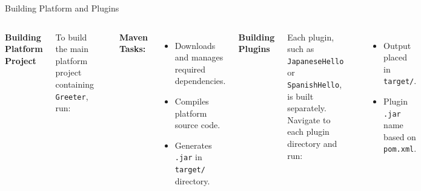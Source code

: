 \documentclass[aspectratio=169, table]{beamer}
\begin{document}
\begin{frame}[fragile]{Building Platform and Plugins}
	\vspace{20pt}
	\begin{columns}[t]
		\textbf{Building Platform Project}
		
		To build the main platform project containing \texttt{Greeter}, run:
		
		\begin{lstlisting}[language=bash, basicstyle=\footnotesize\ttfamily]
			mvn clean package install
		\end{lstlisting}
		
		\textbf{Maven Tasks:}
		\begin{itemize}
			\item Downloads and manages required dependencies.
			\item Compiles platform source code.
			\item Generates \texttt{.jar} in \texttt{target/} directory.
		\end{itemize}
		
		\textbf{Building Plugins}
		
		Each plugin, such as \texttt{JapaneseHello} or \texttt{SpanishHello}, is built separately. Navigate to each plugin directory and run:
		
		\begin{lstlisting}[language=bash, basicstyle=\footnotesize\ttfamily]
			mvn clean package
		\end{lstlisting}
		
		\begin{itemize}
			\item Output placed in \texttt{target/}.
			\item Plugin \texttt{.jar} name based on \texttt{pom.xml}.
		\end{itemize}
	\end{columns}
\end{frame}
\end{document}
